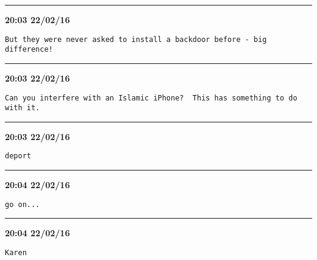 \hrule%

\begin{adjustwidth}{0cm}{0cm}
\footnotesize \textbf{20:03 22/02/16}

\begin{lstlisting}[breaklines, breakatwhitespace, basicstyle=\small, frame=leftline]
But they were never asked to install a backdoor before - big difference!
\end{lstlisting}
\end{adjustwidth}

\hrule%

\begin{adjustwidth}{0cm}{0cm}
\footnotesize \textbf{20:03 22/02/16}

\begin{lstlisting}[breaklines, breakatwhitespace, basicstyle=\small, frame=leftline]
Can you interfere with an Islamic iPhone?  This has something to do with it.
\end{lstlisting}
\end{adjustwidth}

\hrule%

\begin{adjustwidth}{0cm}{0cm}
\footnotesize \textbf{20:03 22/02/16}

\begin{lstlisting}[breaklines, breakatwhitespace, basicstyle=\small, frame=leftline]
deport
\end{lstlisting}
\end{adjustwidth}

\hrule%

\begin{adjustwidth}{0cm}{0cm}
\footnotesize \textbf{20:04 22/02/16}

\begin{lstlisting}[breaklines, breakatwhitespace, basicstyle=\small, frame=leftline]
go on...
\end{lstlisting}
\end{adjustwidth}

\hrule%

\begin{adjustwidth}{0cm}{0cm}
\footnotesize \textbf{20:04 22/02/16}

\begin{lstlisting}[breaklines, breakatwhitespace, basicstyle=\small, frame=leftline]
Karen
\end{lstlisting}
\end{adjustwidth}

